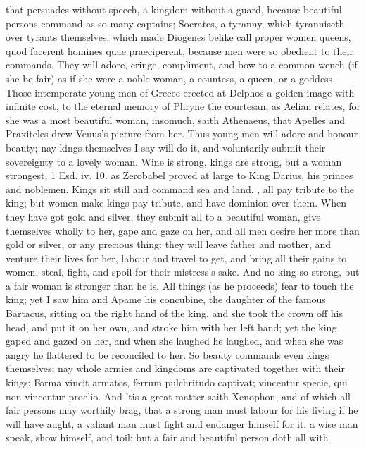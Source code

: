 {that persuades without speech, a kingdom without a guard, because
beautiful persons command as so many captains; Socrates, a tyranny,
which tyranniseth over tyrants themselves; which made Diogenes belike
call proper women queens, quod facerent homines quae praeciperent,
because men were so obedient to their commands. They will adore,
cringe, compliment, and bow to a common wench (if she be fair) as if
she were a noble woman, a countess, a queen, or a goddess. Those
intemperate young men of Greece erected at Delphos a golden image with
infinite cost, to the eternal memory of Phryne the courtesan, as Aelian
relates, for she was a most beautiful woman, insomuch, saith
Athenaeus, that Apelles and Praxiteles drew Venus's picture from
her. Thus young men will adore and honour beauty; nay kings themselves
I say will do it, and voluntarily submit their sovereignty to a lovely
woman. Wine is strong, kings are strong, but a woman strongest, 1 Esd.
iv. 10. as Zerobabel proved at large to King Darius, his princes and
noblemen. Kings sit still and command sea and land, \etc{}, all pay
tribute to the king; but women make kings pay tribute, and have
dominion over them. When they have got gold and silver, they submit all
to a beautiful woman, give themselves wholly to her, gape and gaze on
her, and all men desire her more than gold or silver, or any precious
thing: they will leave father and mother, and venture their lives for
her, labour and travel to get, and bring all their gains to women,
steal, fight, and spoil for their mistress's sake. And no king so
strong, but a fair woman is stronger than he is. All things (as
he proceeds) fear to touch the king; yet I saw him and Apame his
concubine, the daughter of the famous Bartacus, sitting on the right
hand of the king, and she took the crown off his head, and put it on
her own, and stroke him with her left hand; yet the king gaped and
gazed on her, and when she laughed he laughed, and when she was angry
he flattered to be reconciled to her. So beauty commands even kings
themselves; nay whole armies and kingdoms are captivated together with
their kings: Forma vincit armatos, ferrum pulchritudo captivat;
vincentur specie, qui non vincentur proelio. And 'tis a great matter
saith Xenophon, and of which all fair persons may worthily brag,
that a strong man must labour for his living if he will have aught, a
valiant man must fight and endanger himself for it, a wise man speak,
show himself, and toil; but a fair and beautiful person doth all with
}
